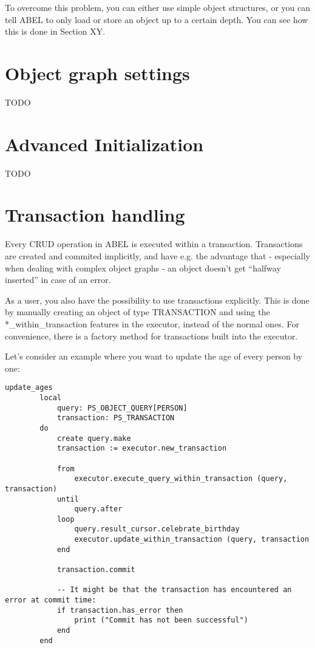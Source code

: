 To overcome this problem, you can either use simple object structures, or you can tell ABEL to only load or store an object up to a certain depth.
You can see how this is done in Section XY.


\section{Object graph settings}

TODO

\section{Advanced Initialization}

TODO

\section{Transaction handling}

Every CRUD operation in ABEL is executed within a transaction. 
Transactions are created and commited implicitly, and have e.g. the advantage that - especially when dealing with complex object graphs - an object doesn't get ``halfway inserted'' in case of an error.

As a user, you also have the possibility to use transactions explicitly. This is done by manually creating an object of type TRANSACTION and using the *\_within\_transaction features in the executor, instead of the normal ones.
For convenience, there is a factory method for transactions built into the executor.

Let's consider an example where you want to update the age of every person by one:

\begin{lstlisting}[language=OOSC2Eiffel, captionpos=b, caption={}, label={lst:update_all_ages}]
	update_ages
		local
			query: PS_OBJECT_QUERY[PERSON]
			transaction: PS_TRANSACTION
		do
			create query.make
			transaction := executor.new_transaction

			from
				executor.execute_query_within_transaction (query, transaction)
			until
				query.after
			loop
				query.result_cursor.celebrate_birthday
				executor.update_within_transaction (query, transaction
			end

			transaction.commit

			-- It might be that the transaction has encountered an error at commit time:
			if transaction.has_error then
				print ("Commit has not been successful")
			end
		end
\end{lstlisting}

